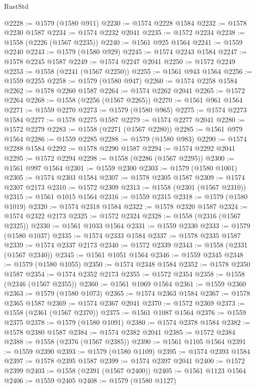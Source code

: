 \begin{lexlean}{RustStd}
\begin{coremodule}
@2228 := @1579 (@1580 @911)
@2230 := @1574 @2228 @1584
@2232 := @1578 @2230 @1587
@2234 := @1574 @2232 @2041
@2235 := @1572 @2234
@2238 := @1558 (@2226 (@1567 @2235))
@2240 := @1561 @925 @1564
@2241 := @1559 @2240
@2243 := @1579 (@1580 @929)
@2245 := @1574 @2243 @1584
@2247 := @1578 @2245 @1587
@2249 := @1574 @2247 @2041
@2250 := @1572 @2249
@2253 := @1558 (@2241 (@1567 @2250))
@2255 := @1561 @943 @1564
@2256 := @1559 @2255
@2258 := @1579 (@1580 @947)
@2260 := @1574 @2258 @1584
@2262 := @1578 @2260 @1587
@2264 := @1574 @2262 @2041
@2265 := @1572 @2264
@2268 := @1558 (@2256 (@1567 @2265))
@2270 := @1561 @961 @1564
@2271 := @1559 @2270
@2273 := @1579 (@1580 @965)
@2275 := @1574 @2273 @1584
@2277 := @1578 @2275 @1587
@2279 := @1574 @2277 @2041
@2280 := @1572 @2279
@2283 := @1558 (@2271 (@1567 @2280))
@2285 := @1561 @979 @1564
@2286 := @1559 @2285
@2288 := @1579 (@1580 @983)
@2290 := @1574 @2288 @1584
@2292 := @1578 @2290 @1587
@2294 := @1574 @2292 @2041
@2295 := @1572 @2294
@2298 := @1558 (@2286 (@1567 @2295))
@2300 := @1561 @997 @1564
@2301 := @1559 @2300
@2303 := @1579 (@1580 @1001)
@2305 := @1574 @2303 @1584
@2307 := @1578 @2305 @1587
@2309 := @1574 @2307 @2173
@2310 := @1572 @2309
@2313 := @1558 (@2301 (@1567 @2310))
@2315 := @1561 @1015 @1564
@2316 := @1559 @2315
@2318 := @1579 (@1580 @1019)
@2320 := @1574 @2318 @1584
@2322 := @1578 @2320 @1587
@2324 := @1574 @2322 @2173
@2325 := @1572 @2324
@2328 := @1558 (@2316 (@1567 @2325))
@2330 := @1561 @1033 @1564
@2331 := @1559 @2330
@2333 := @1579 (@1580 @1037)
@2335 := @1574 @2333 @1584
@2337 := @1578 @2335 @1587
@2339 := @1574 @2337 @2173
@2340 := @1572 @2339
@2343 := @1558 (@2331 (@1567 @2340))
@2345 := @1561 @1051 @1564
@2346 := @1559 @2345
@2348 := @1579 (@1580 @1055)
@2350 := @1574 @2348 @1584
@2352 := @1578 @2350 @1587
@2354 := @1574 @2352 @2173
@2355 := @1572 @2354
@2358 := @1558 (@2346 (@1567 @2355))
@2360 := @1561 @1069 @1564
@2361 := @1559 @2360
@2363 := @1579 (@1580 @1073)
@2365 := @1574 @2363 @1584
@2367 := @1578 @2365 @1587
@2369 := @1574 @2367 @2041
@2370 := @1572 @2369
@2373 := @1558 (@2361 (@1567 @2370))
@2375 := @1561 @1087 @1564
@2376 := @1559 @2375
@2378 := @1579 (@1580 @1091)
@2380 := @1574 @2378 @1584
@2382 := @1578 @2380 @1587
@2384 := @1574 @2382 @2041
@2385 := @1572 @2384
@2388 := @1558 (@2376 (@1567 @2385))
@2390 := @1561 @1105 @1564
@2391 := @1559 @2390
@2393 := @1579 (@1580 @1109)
@2395 := @1574 @2393 @1584
@2397 := @1578 @2395 @1587
@2399 := @1574 @2397 @2041
@2400 := @1572 @2399
@2403 := @1558 (@2391 (@1567 @2400))
@2405 := @1561 @1123 @1564
@2406 := @1559 @2405
@2408 := @1579 (@1580 @1127)

\end{coremodule}
\end{lexlean}
